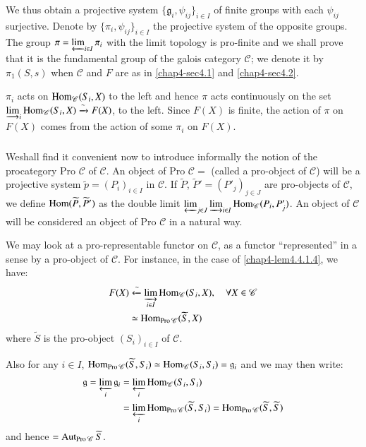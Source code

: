 We thus obtain a projective system
$\{\mathfrak{g}_{i},\psi_{ij}\}_{i\in I}$ of finite groups with each
$\psi_{ij}$ surjective. Denote by $\{\pi_{i},\psi_{ij}\}_{i\in I}$ the
projective system of the opposite groups. The group
$\pi=\varprojlim_{i\in I}\pi_{i}$ with the limit topology is
pro-finite and we shall prove that it is the fundamental group of the
galois category $\mathscr{C}$; we denote it by $\pi_{1}(S,s)$ when
$\mathscr{C}$ and $F$ are as in \ref{chap4-sec4.1} and \ref{chap4-sec4.2}.

$\pi_{i}$ acts on $\operatorname{Hom}_{\mathscr{C}}(S_{i},X)$ to the left and hence
$\pi$ acts continuously on the set
$\varinjlim_{i}\operatorname{Hom}_{\mathscr{C}}(S_{i},X)\xrightarrow{\sim}F(X)$, to
the left. Since $F(X)$ is finite, the action of $\pi$ on $F(X)$ comes
from the action of some $\pi_{i}$ on $F(X)$.

\setcounter{subsubsection}{8}
\subsubsection{}\label{chap4-sec4.4.1.9}
We\pageoriginale shall find it convenient now to introduce informally
the notion of the procategory Pro $\mathscr{C}$ of $\mathscr{C}$. An
object of Pro $\mathscr{C}=$ (called a pro-object of $\mathscr{C}$)
will be a projective system $\widetilde{p}=(P_{i})_{i\in I}$ in
$\mathscr{C}$. If $\widetilde{P}$, $\widetilde{P}'=(P'_{j})_{j\in J}$
are pro-objects of $\mathscr{C}$, we define
$\operatorname{Hom}(\widetilde{P},\widetilde{P}')$ as the double limit
$\varprojlim_{j\in J}\varinjlim_{i\in
  I}\operatorname{Hom}_{\mathscr{C}}(P_{i},P'_{j})$. An object of $\mathscr{C}$ will
be considered an object of Pro $\mathscr{C}$ in a natural way.

We may look at a pro-representable functor on $\mathscr{C}$, as a
functor ``represented'' in a sense by a pro-object of
$\mathscr{C}$. For instance, in the case of \ref{chap4-lem4.4.1.4}, we have:
\begin{align*}
F(X) & \xleftarrow{\sim} \varinjlim_{i\in
  I}\operatorname{Hom}_{\mathscr{C}}(S_{i},X),\quad \forall X\in\mathscr{C}\\
&\simeq \operatorname{Hom}_{\operatorname{Pro}\mathscr{C}}(\widetilde{S},X)
\end{align*}
where $\widetilde{S}$ is the pro-object $(S_{i})_{i\in I}$ of
$\mathscr{C}$.

Also for any $i\in I$,
$\operatorname{Hom}_{\operatorname{Pro}\mathscr{C}}(\widetilde{S},S_{i})\simeq
\operatorname{Hom}_{\mathscr{C}}(S_{i},S_{i})=\mathfrak{g}_{i}$ and we may then
write:
\begin{align*}
\mathfrak{g}=\varprojlim_{i}\mathfrak{g}_{i} &=
\varprojlim_{i}\operatorname{Hom}_{\mathscr{C}}(S_{i},S_{i})\\
&=
\varprojlim_{i}\operatorname{Hom}_{\operatorname{Pro}\mathscr{C}}(\widetilde{S},S_{i})=\operatorname{Hom}_{\operatorname{Pro}\mathscr{C}}(\widetilde{S},\widetilde{S}) 
\end{align*}
and hence $=\operatorname{Aut}_{\operatorname{Pro}\mathscr{C}}\widetilde{S}$.


